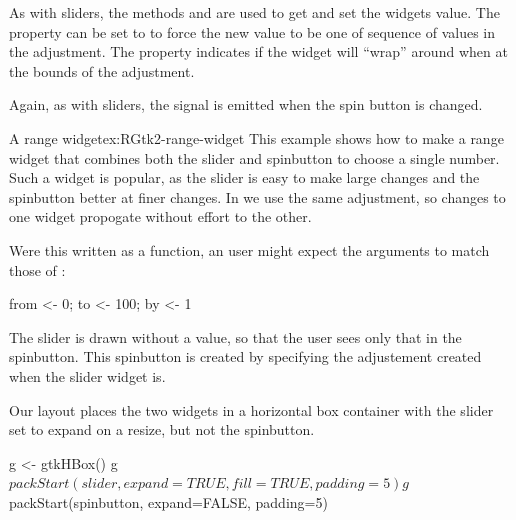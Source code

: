 As with sliders, the methods
 and 
are used to get and set the widgets value. The property
 can be set to  to force the new value
to be one of sequence of values in the adjustment. The 
property indicates if the widget will ``wrap'' around when at the
bounds of the adjustment.

Again, as with sliders, the  signal is emitted when the
spin button is changed. 

\begin{example}{A range widget}{ex:RGtk2-range-widget}
This example shows how to make a range widget that combines both the slider and spinbutton to choose a single number. Such a widget is popular, as the slider is easy to make large changes and the spinbutton better at finer changes. In \GTK\/ we use the same adjustment, so changes to one widget propogate without effort to the other.


Were this written as a function, an \R\/ user might expect the
arguments to match those of :
\begin{Schunk}
\begin{Sinput}
 from <- 0; to <- 100; by <- 1
\end{Sinput}
\end{Schunk}

The slider is drawn without a value, so that the user sees only that
in the spinbutton. This spinbutton is created by specifying the
adjustement created when the slider widget is.
\begin{Schunk}
\end{Schunk}
Our layout places the two widgets in a horizontal box container with
the slider set to expand on a resize, but not the spinbutton.
\begin{Schunk}
\begin{Sinput}
 g <- gtkHBox()
 g$packStart(slider, expand=TRUE, fill=TRUE, padding=5)
 g$packStart(spinbutton, expand=FALSE, padding=5)
\end{Sinput}
\end{Schunk}


\end{example}

